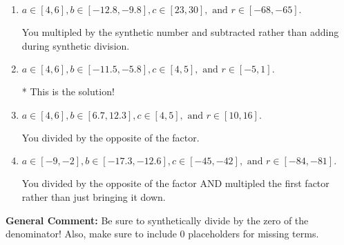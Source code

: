\documentclass{extbook}[14pt]
\begin{document}
\begin{enumerate}
{\begin{enumerate}[label=\Alph*.]
 You multipled by the synthetic number rather than bringing the first factor down.
\item \( a \in [4, 6], b \in [-12.8, -9.8], c \in [23, 30], \text{ and } r \in [-68, -65]. \)

 You multipled by the synthetic number and subtracted rather than adding during synthetic division.
\item \( a \in [4, 6], b \in [-11.5, -5.8], c \in [4, 5], \text{ and } r \in [-5, 1]. \)

* This is the solution!
\item \( a \in [4, 6], b \in [6.7, 12.3], c \in [4, 5], \text{ and } r \in [10, 16]. \)

 You divided by the opposite of the factor.
\item \( a \in [-9, -2], b \in [-17.3, -12.6], c \in [-45, -42], \text{ and } r \in [-84, -81]. \)

 You divided by the opposite of the factor AND multipled the first factor rather than just bringing it down.
\end{enumerate}

\textbf{General Comment:} Be sure to synthetically divide by the zero of the denominator! Also, make sure to include 0 placeholders for missing terms.
}
\end{enumerate}
\end{document}
